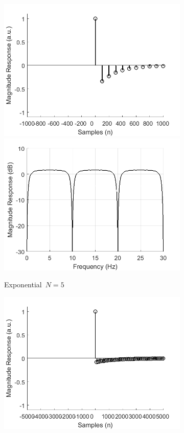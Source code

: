 \documentclass[a4paper]{article}
\begin{document}
\begin{figure}[hbtp]
\begin{subfigure}{.33\textwidth}
        \includegraphics[width=\textwidth]{img/np/kernel_exp_10.png}\\
        \includegraphics[width=\textwidth]{img/np/mag_exp_10.png}
        \caption{Exponential~$N=5$}\label{fig:ExpNP10}
    \end{subfigure}
    \begin{subfigure}{.33\textwidth}
        \includegraphics[width=\textwidth]{img/np/kernel_exp_50.png}\\

\end{subfigure}
\end{figure}
\end{document}
